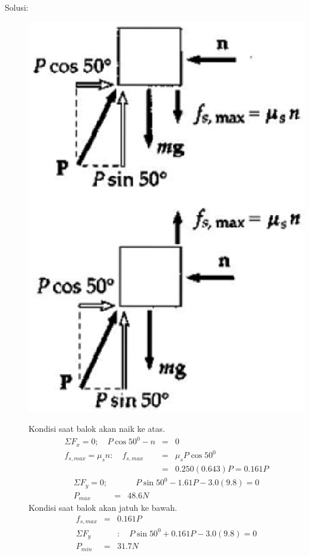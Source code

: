 \begin{description}
    \item[Solusi:]
        \mbox{}
\begin{center}
\includegraphics [scale=0.4]{./latex/eps/1_5_14_image_2.eps}
\end{center}

Kondisi saat balok akan naik ke atas. \\
\begin{eqnarray*}
\Sigma F_{x}=0 ;\quad P\cos 50^{0}-n&=&0 \\
f_{s,max}=\mu_{s}n: \quad f_{s,max}&=&\mu_{s} P \cos 50^{0} \\
&=& 0.250(0.643)P=0.161P
\end{eqnarray*}
\begin{eqnarray*}
\Sigma F_{y}=0;& &\quad P\sin 50^{0}-1.61P-3.0(9.8)=0 \\
P_{max}&=&48.6 N
\end{eqnarray*}
Kondisi saat balok akan jatuh ke bawah. \\
\begin{eqnarray*}
f_{s,max}&=&0.161P  \\
\Sigma F_{y}& &:\quad P\sin50^{0}+0.161P-3.0(9.8)=0 \\
P_{min}&=&31.7 N
\end{eqnarray*} 

\end{description}
